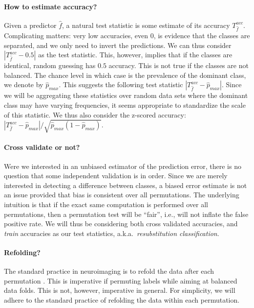 \documentclass[12pt,a4paper]{article}
\newcommand{\hyp}{f} %
\newcommand{\hypEstim}{\hat{\hyp}} %
\newcommand{\acc}{T^{acc}}
\newcommand{\dominant}{\hat{p}_{max}}
\begin{document}
\paragraph{How to estimate accuracy?}
\label{sec:estimate_accuracy}
Given a predictor $\hypEstim$, a natural test statistic is some estimate of its accuracy $\acc_{\hypEstim}$.
Complicating matters: very low accuracies, even $0$, is evidence that the classes are separated, and we only need to invert the predictions. 
We can thus consider $|\acc_{\hypEstim}-0.5|$ as the test statistic.
This, however, implies that if the classes are identical, random guessing has $0.5$ accuracy. This is not true if the classes are not balanced. 
The chance level in which case is the prevalence of the dominant class, we denote by $\dominant$.
This suggests the following test statistic $|\acc_{\hypEstim}-\dominant|$.
Since we will be aggregating these statistics over random data sets where the dominant class may have varying frequencies, it seems appropriate to standardize the scale of this statistic. 
We thus also consider the z-scored accuracy: $|\acc_{\hypEstim}-\dominant|/\sqrt{\dominant(1-\dominant)}$.


\paragraph{Cross validate or not?}
Were we interested in an unbiased estimator of the prediction error, there is no question that some independent validation is in order. 
Since we are merely interested in detecting a difference between classes, a biased error estimate is not an issue provided that bias is consistent over all permutations. 
The underlying intuition is that if the exact same computation is performed over all permutations, then a permutation test will be ``fair'', i.e., will not inflate the false positive rate. 
We will thus be considering both cross validated accuracies, and \emph{train} accuracies as our test statistics, a.k.a.\ \emph{resubstitution classification}. 


\paragraph{Refolding?}
The standard practice in neuroimaging is to refold the data after each permutation \citep{pereira_machine_2009}.
This is imperative if permuting labels while aiming at balanced data folds. 
This is not, however, imperative in general. 
For simplicity, we will adhere to the standard practice of refolding the data within each permutation.
\end{document}
